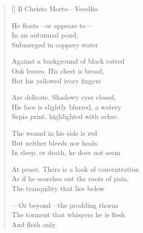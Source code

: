 \label{ch:venezia_scuola}
\settowidth{\versewidth}{At peace. There is a look of concentration}
\begin{verse}[\versewidth]
Il Christo Morto---Vecellio

He floats---or appears to---\\
In an autumnal pond,\\
Submerged in coppery water

Against a background of black rotted\\
Oak leaves.   His chest is broad,\\
But his yellowed ivory fingers

Are delicate.  Shadowy eyes closed,\\
His face is slightly blurred, a watery\\
Sepia print, highlighted with ochre.

The wound in his side is red\\
But neither bleeds nor heals.\\
In sleep, or death, he does not seem

At peace. There is a look of concentration\\
As if he searches out the roots of pain,\\
The tranquility that lies below

---Or beyond---the prodding thorns\\
The torment that whispers he is flesh\\
And flesh only.
\end{verse}
